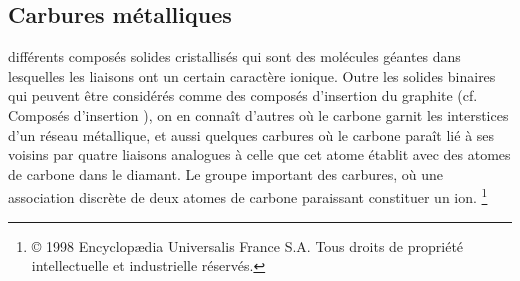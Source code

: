\documentclass[a4 paper, 10 pt]{article}
\begin{document}
\subsection{Carbures métalliques}

différents composés solides cristallisés qui sont des
molécules géantes dans lesquelles les liaisons ont un certain
caractère ionique. Outre les solides binaires qui peuvent être
considérés comme des composés d'insertion du graphite
(cf. Composés d'insertion ), on en connaît d'autres où le
carbone garnit les interstices d'un réseau métallique, et aussi
quelques carbures où le carbone paraît lié à ses voisins
par quatre liaisons analogues à celle que cet atome établit avec
des atomes de carbone dans le diamant.  Le groupe important des
carbures, où une association discrète de deux atomes de carbone
paraissant constituer un ion.
\footnote{© 1998 Encyclopædia Universalis France S.A. Tous droits de
propriété intellectuelle et industrielle réservés.}

	
\end{document}
